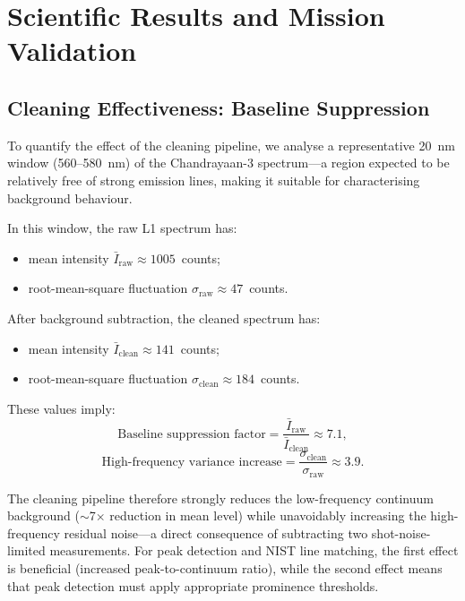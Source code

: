 \documentclass[a4paper,twocolumn,10pt]{article}
\begin{document}
\section{Scientific Results and Mission Validation}
\label{sec:results}

\subsection{Cleaning Effectiveness: Baseline Suppression}

To quantify the effect of the cleaning pipeline, we analyse a
representative 20~nm window (560--580~nm) of the Chandrayaan-3
spectrum---a region expected to be relatively free of strong emission
lines, making it suitable for characterising background behaviour.

In this window, the raw L1 spectrum has:
\begin{itemize}[nosep,leftmargin=*]
  \item mean intensity $\bar{I}_{\text{raw}} \approx 1005$~counts;
  \item root-mean-square fluctuation
    $\sigma_{\text{raw}} \approx 47$~counts.
\end{itemize}

After background subtraction, the cleaned spectrum has:
\begin{itemize}[nosep,leftmargin=*]
  \item mean intensity $\bar{I}_{\text{clean}} \approx 141$~counts;
  \item root-mean-square fluctuation
    $\sigma_{\text{clean}} \approx 184$~counts.
\end{itemize}

These values imply:
\begin{equation}
\text{Baseline suppression factor} =
  \frac{\bar{I}_{\text{raw}}}{\bar{I}_{\text{clean}}} \approx 7.1,
\end{equation}
\begin{equation}
\text{High-frequency variance increase} =
  \frac{\sigma_{\text{clean}}}{\sigma_{\text{raw}}} \approx 3.9.
\end{equation}

The cleaning pipeline therefore strongly reduces the low-frequency
continuum background ($\sim$7$\times$ reduction in mean level) while
unavoidably increasing the high-frequency residual noise---a direct
consequence of subtracting two shot-noise-limited measurements.
For peak detection and NIST line matching, the first effect is
beneficial (increased peak-to-continuum ratio), while the second
effect means that peak detection must apply appropriate prominence
thresholds.
\end{document}
